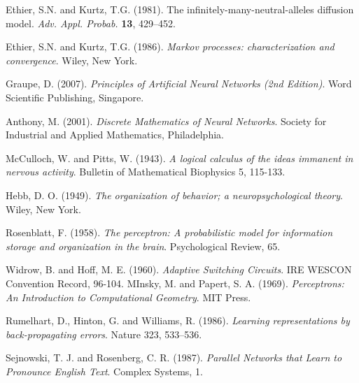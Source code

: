 \documentclass[%
    corpo=11pt,
    twoside,
    stile=classica,
    oldstyle,
    autoretitolo,
    tipotesi=magistrale,
    greek,
    evenboxes,
    english
]{toptesi}
\begin{document}





\begin{thebibliography}{99}

  {\sc Ethier, S.N.} and {\sc Kurtz, T.G.} (1981). The infinitely-many-neutral-alleles diffusion model. {\em Adv. Appl. Probab.} {\bf 13}, 429--452.

  {\sc Ethier, S.N.} and {\sc Kurtz, T.G.} (1986). \emph{Markov processes: characterization and convergence}. Wiley, New York.

 {\sc Graupe, D.} (2007). \textit{Principles of Artificial Neural Networks (2nd Edition)}. Word Scientific Publishing, Singapore.
 
 {\sc Anthony, M. } (2001). \textit{Discrete Mathematics of Neural Networks}. Society for Industrial and Applied Mathematics, Philadelphia.

 {\sc McCulloch, W.} and {\sc Pitts, W}. (1943). \textit{A logical calculus of the ideas immanent in nervous activity}. Bulletin of Mathematical Biophysics 5, 115-133.

 {\sc Hebb, D. O.} (1949). \textit{The organization of behavior; a neuropsychological theory}. Wiley, New York.

 {\sc Rosenblatt, F.} (1958). \textit{The perceptron: A probabilistic model for information storage and organization in the brain}. Psychological Review, 65.

 {\sc Widrow, B.} and {\sc Hoff, M. E.} (1960). \textit{Adaptive Switching Circuits}. IRE WESCON Convention Record, 96-104.
 {\sc MInsky, M.} and {\sc Papert, S. A.} (1969). \textit{Perceptrons: An Introduction to Computational Geometry}. MIT Press.

 {\sc Rumelhart, D.}, {\sc Hinton, G.} and {\sc Williams, R.} (1986). \textit{Learning representations by back-propagating errors}. Nature 323, 533–536.

 {\sc Sejnowski, T. J.} and {\sc Rosenberg, C. R.} (1987). \textit{Parallel Networks that Learn to Pronounce English Text}. Complex Systems, 1.


\end{thebibliography}
\end{document}
